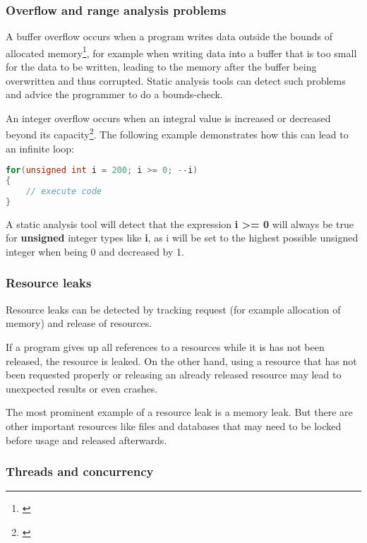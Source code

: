 \subsubsection{Overflow and range analysis problems}

A buffer overflow occurs when a program writes data outside the bounds of allocated memory\footnote{\citep[175]{SecureProgramming}}, for example when writing data into a buffer that is too small for the data to be written, leading to the memory after the buffer being overwritten and thus corrupted. Static analysis tools can detect such problems and advice the programmer to do a bounds-check.

An integer overflow occurs when an integral value is increased or decreased beyond its capacity\footnote{\citep[235]{SecureProgramming}}. The following example demonstrates how this can lead to an infinite loop:

\begin{lstlisting}[language=C++, caption=Integer ''underflow'' in C++]
for(unsigned int i = 200; i >= 0; --i)
{
	// execute code
}
\end{lstlisting}

A static analysis tool will detect that the expression \textbf{i \textgreater= 0} will always be true for \textbf{unsigned} integer types like \textbf{i}, as i will be set to the highest possible unsigned integer when being 0 and decreased by 1.

\subsubsection{Resource leaks}

Resource leaks can be detected by tracking request (for example allocation of memory) and release of resources.

If a program gives up all references to a resources while it is has not been released, the resource is leaked. On the other hand, using a resource that has not been requested properly or releasing an already released resource may lead to unexpected results or even crashes.

The most prominent example of a resource leak is a memory leak. But there are other important resources like files and databases that may need to be locked before usage and released afterwards.

\subsubsection{Threads and concurrency}

